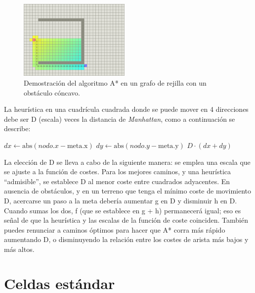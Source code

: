 \documentclass[reprint,amsmath,amssymb,aps]{revtex4-2}
\begin{document}
\begin{figure}[H]
	\centering
	\includegraphics[width=0.48\textwidth]{a-star-trap.png}
	\caption{Demostración del algoritmo A* en un grafo de rejilla con un obstáculo cóncavo.}
	\label{a-star-trap}
\end{figure}

La heurística en una cuadrícula cuadrada donde se puede mover en 4 direcciones debe ser D (escala) veces la distancia de \textit{Manhattan}, como a continuación se describe:

\begin{algorithmic}
        \State $dx \gets \text{abs}(nodo.x - \text{meta.x})$
        \State $dy \gets \text{abs}(nodo.y - \text{meta.y})$
        \State \Return $D \cdot (dx + dy)$
    \EndFunction
\end{algorithmic}


La elección de D se lleva a cabo de la siguiente manera: se emplea una escala que se ajuste a la función de costes. Para los mejores caminos, y una heurística ``admisible'', se establece D al menor coste entre cuadrados adyacentes. En ausencia de obstáculos, y en un terreno que tenga el mínimo coste de movimiento D, acercarse un paso a la meta debería aumentar g en D y disminuir h en D. Cuando sumas los dos, f (que se establece en g + h) permanecerá igual; eso es señal de que la heurística y las escalas de la función de coste coinciden. También puedes renunciar a caminos óptimos para hacer que A* corra más rápido aumentando D, o disminuyendo la relación entre los costes de arista más bajos y más altos.

\section{Celdas estándar}
\end{document}
